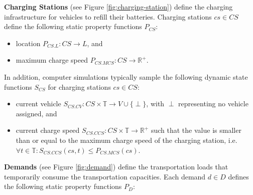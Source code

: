 \documentclass[graybox]{svmult}
\begin{document}
\noindent
\textbf{Charging Stations} (see Figure \ref{fig:charging-station})
define the charging infrastructure for vehicles to refill their batteries.
Charging stations $cs \in CS$ define the following static property functions $P_{CS}$:
\begin{itemize}
	\item location $P_{CS.L}: CS \rightarrow L$, and
	\item maximum charge speed $P_{CS.MCS}: CS \rightarrow \mathbb{R}^+$.
\end{itemize}
In addition, computer simulations typically sample the following dynamic state functions $S_{CS}$ for charging stations $cs \in CS$:
\begin{itemize}
	\item current vehicle $S_{CS.CV}: CS \times \mathbb{T} \rightarrow V \cup \{\perp\}$, with $\perp$ representing no vehicle assigned, and
	\item current charge speed $S_{CS.CCS}: CS \times \mathbb{T} \rightarrow \mathbb{R}^+$ such that the value is smaller than or equal to the maximum charge speed of the charging station, i.e.\ $\forall t \in \mathbb{T}: S_{CS.CCS}(cs,t) \leq P_{CS.MCS}(cs)$.
\end{itemize}

\vspace{2mm}
\noindent
\textbf{Demands} (see Figure \ref{fig:demand})
 define the transportation loads that temporarily consume the transportation capacities. Each demand $d \in D$ defines the following static property functions $P_D$:
\end{document}
